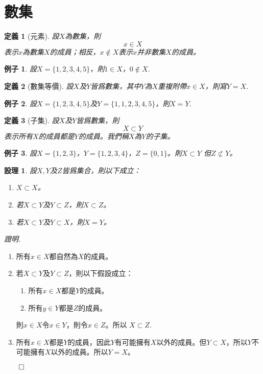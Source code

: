 \documentclass[12pt]{article}
\newtheorem{definition}{定義}
\newtheorem*{proposition}{設理}
\newtheorem*{example}{例子}
\renewenvironment*{proof}{\textit{證明.}}{\hfill$\qed$}
\begin{document}
    \section*{數集}

    \begin{definition}[元素]
        設$X$為數集，則$$x\in X$$表示$x$為數集$X$的成員；相反，$x\notin X$表示$x$并非數集$X$的成員。 
    \end{definition}

    \begin{example}
        設$X=\{1,2,3,4,5\}$，則$1\in X$，$0\notin X$.
    \end{example}

    \begin{definition}[數集等價]
        設$X$及$Y$皆爲數集，其中$Y$為$X$重複附帶$x\in X$，則寫$Y=X$.
    \end{definition}

    \begin{example}
        設$X=\{1,2,3,4,5\}$及$Y=\{1,1,2,3,4,5\}$，則$X=Y$.
    \end{example}

    \begin{definition}[子集]
        設$X$及$Y$皆爲數集，則$$X\subset Y$$ 表示所有$X$的成員都是$Y$的成員。我們稱$X$為$Y$的子集。
    \end{definition}

    \begin{example}
        設$X=\{1,2,3\}$，$Y=\{1,2,3,4\}$，$Z=\{0,1\}$。則$X\subset Y$ 但$Z\not \subset Y$。
    \end{example}

    \begin{proposition}
        設$X,Y$及$Z$皆爲集合，則以下成立：\begin{enumerate}
            \item $X\subset X$。
            \item 若$X\subset Y$及$Y\subset Z$，則$X\subset Z$。
            \item 若$X\subset Y$及$Y\subset X$，則$X=Y$。
        \end{enumerate}
    \end{proposition}

    \begin{proof}
        \begin{enumerate}
            \item 所有$x\in X$都自然為$X$的成員。
            \item 若$X\subset Y$及$Y\subset Z$，則以下假設成立：\begin{enumerate}
                \item 所有$x\in X$都是$Y$的成員。
                \item 所有$y\in Y$都是$Z$的成員。
            \end{enumerate}
            則$x\in X$令$x\in Y$，則令$x\in Z$。所以 $X\subset Z$.
            \item 所有$x\in X$都是$Y$的成員，因此$Y$有可能擁有$X$以外的成員。但$Y\subset X$，所以$Y$不可能擁有$X$以外的成員。所以$Y=X$。
        \end{enumerate}
    \end{proof}
\end{document}
